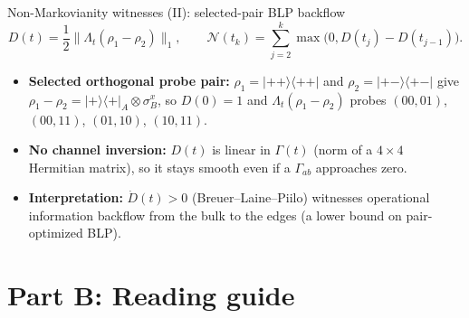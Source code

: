 \documentclass[aspectratio=169,11pt]{beamer}
\newcommand{\ket}[1]{\lvert #1\rangle}
\newcommand{\bra}[1]{\langle #1\rvert}
\begin{document}
\begin{frame}{Non-Markovianity witnesses (II): selected-pair BLP backflow}
\small
\[
D(t)=\frac12\bigl\lVert\Lambda_t(\rho_1-\rho_2)\bigr\rVert_1,\qquad
\mathcal N(t_k)=\sum_{j=2}^{k}\max\bigl(0,D(t_j)-D(t_{j-1})\bigr).
\]
\begin{itemize}\setlength\itemsep{5pt}
\item \textbf{Selected orthogonal probe pair:} $\rho_1=\ket{++}\bra{++}$ and $\rho_2=\ket{+-}\bra{+-}$ give $\rho_1-\rho_2=\ket+\bra+_A\otimes\sigma_B^x$, so $D(0)=1$ and $\Lambda_t(\rho_1-\rho_2)$ probes $(00,01)$, $(00,11)$, $(01,10)$, $(10,11)$.
\item \textbf{No channel inversion:} $D(t)$ is linear in $\Gamma(t)$ (norm of a $4\times 4$ Hermitian matrix), so it stays smooth even if a $\Gamma_{ab}$ approaches zero.
\item \textbf{Interpretation:} $\dot D(t)>0$ (Breuer--Laine--Piilo) witnesses operational information backflow from the bulk to the edges (a lower bound on pair-optimized BLP).
\end{itemize}
\end{frame}

\section{Part B: Reading guide}
\end{document}
